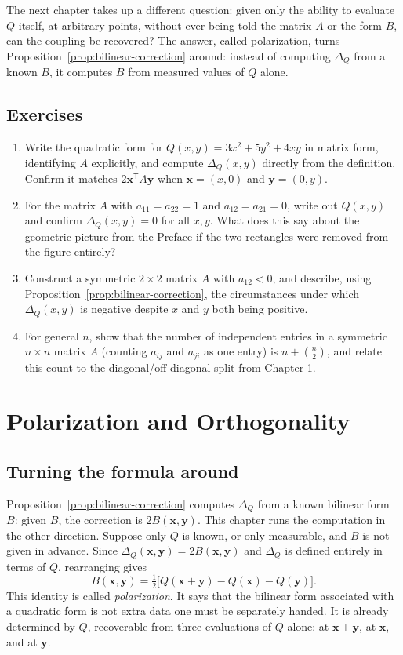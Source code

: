 \documentclass[11pt]{book}
\begin{document}
The next chapter takes up a different question: given only the ability to evaluate $Q$ itself, at arbitrary points, without ever being told the matrix $A$ or the form $B$, can the coupling be recovered? The answer, called polarization, turns Proposition~\ref{prop:bilinear-correction} around: instead of computing $\Delta_Q$ from a known $B$, it computes $B$ from measured values of $Q$ alone.

\section*{Exercises}
\begin{enumerate}
\item Write the quadratic form for $Q(x,y)=3x^2+5y^2+4xy$ in matrix form, identifying $A$ explicitly, and compute $\Delta_Q(x,y)$ directly from the definition. Confirm it matches $2\mathbf{x}^{\mathsf T}A\mathbf{y}$ when $\mathbf{x}=(x,0)$ and $\mathbf{y}=(0,y)$.
\item For the matrix $A$ with $a_{11}=a_{22}=1$ and $a_{12}=a_{21}=0$, write out $Q(x,y)$ and confirm $\Delta_Q(x,y)=0$ for all $x,y$. What does this say about the geometric picture from the Preface if the two rectangles were removed from the figure entirely?
\item Construct a symmetric $2\times2$ matrix $A$ with $a_{12}<0$, and describe, using Proposition~\ref{prop:bilinear-correction}, the circumstances under which $\Delta_Q(x,y)$ is negative despite $x$ and $y$ both being positive.
\item For general $n$, show that the number of independent entries in a symmetric $n\times n$ matrix $A$ (counting $a_{ij}$ and $a_{ji}$ as one entry) is $n + \binom{n}{2}$, and relate this count to the diagonal/off-diagonal split from Chapter 1.
\end{enumerate}

\chapter{Polarization and Orthogonality}

\section{Turning the formula around}

Proposition~\ref{prop:bilinear-correction} computes $\Delta_Q$ from a known bilinear form $B$: given $B$, the correction is $2B(\mathbf{x},\mathbf{y})$. This chapter runs the computation in the other direction. Suppose only $Q$ is known, or only measurable, and $B$ is not given in advance. Since $\Delta_Q(\mathbf{x},\mathbf{y})=2B(\mathbf{x},\mathbf{y})$ and $\Delta_Q$ is defined entirely in terms of $Q$, rearranging gives
\[
B(\mathbf{x},\mathbf{y}) = \tfrac{1}{2}\bigl[Q(\mathbf{x}+\mathbf{y})-Q(\mathbf{x})-Q(\mathbf{y})\bigr].
\]
This identity is called \emph{polarization}. It says that the bilinear form associated with a quadratic form is not extra data one must be separately handed. It is already determined by $Q$, recoverable from three evaluations of $Q$ alone: at $\mathbf{x}+\mathbf{y}$, at $\mathbf{x}$, and at $\mathbf{y}$.
\end{document}
